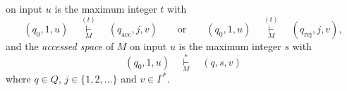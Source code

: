 \begin{definition}
\begin{itemize}
    on input $u$ is the maximum integer $t$ with
    \begin{equation*}
      (q_0, 1, u)
      \quad \mathop\vdash\limits_{M}^{(t)} \quad
      (q_\text{acc}, j, v)
      \qquad \text{or} \qquad
      (q_0, 1, u)
      \quad \mathop\vdash\limits_{M}^{(t)} \quad
      (q_\text{rej}, j, v),
    \end{equation*}
    and the \emph{accessed space} of $M$ on input $u$ is the maximum integer
    $s$ with
    \begin{equation*}
      (q_0, 1, u)
      \quad \mathop\vdash\limits_{M}^* \quad
      (q, s, v)
    \end{equation*}
    where $q \in Q$, $j \in \{1, 2, \dots\}$ and $v \in \Gamma^*$.
  \end{itemize}
\end{definition}
